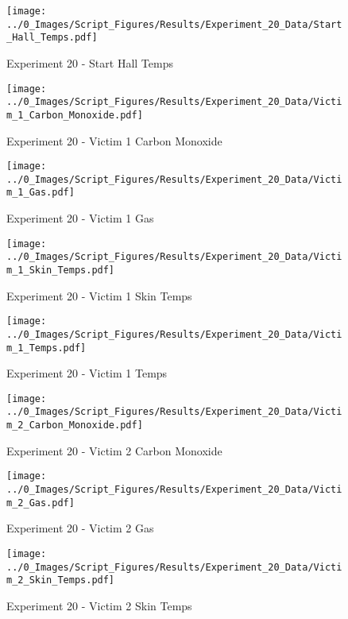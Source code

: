 	\begin{figure}[H]
		\centering
		\texttt{[image: ../0\_Images/Script\_Figures/Results/Experiment\_20\_Data/Start\_Hall\_Temps.pdf]}
		\caption[]{Experiment 20 - Start Hall Temps}
	\end{figure}
 
	\clearpage

	\begin{figure}[H]
		\centering
		\texttt{[image: ../0\_Images/Script\_Figures/Results/Experiment\_20\_Data/Victim\_1\_Carbon\_Monoxide.pdf]}
		\caption[]{Experiment 20 - Victim 1 Carbon Monoxide}
	\end{figure}
 

	\begin{figure}[H]
		\centering
		\texttt{[image: ../0\_Images/Script\_Figures/Results/Experiment\_20\_Data/Victim\_1\_Gas.pdf]}
		\caption[]{Experiment 20 - Victim 1 Gas}
	\end{figure}
 
	\clearpage

	\begin{figure}[H]
		\centering
		\texttt{[image: ../0\_Images/Script\_Figures/Results/Experiment\_20\_Data/Victim\_1\_Skin\_Temps.pdf]}
		\caption[]{Experiment 20 - Victim 1 Skin Temps}
	\end{figure}
 

	\begin{figure}[H]
		\centering
		\texttt{[image: ../0\_Images/Script\_Figures/Results/Experiment\_20\_Data/Victim\_1\_Temps.pdf]}
		\caption[]{Experiment 20 - Victim 1 Temps}
	\end{figure}
 
	\clearpage

	\begin{figure}[H]
		\centering
		\texttt{[image: ../0\_Images/Script\_Figures/Results/Experiment\_20\_Data/Victim\_2\_Carbon\_Monoxide.pdf]}
		\caption[]{Experiment 20 - Victim 2 Carbon Monoxide}
	\end{figure}
 

	\begin{figure}[H]
		\centering
		\texttt{[image: ../0\_Images/Script\_Figures/Results/Experiment\_20\_Data/Victim\_2\_Gas.pdf]}
		\caption[]{Experiment 20 - Victim 2 Gas}
	\end{figure}
 
	\clearpage

	\begin{figure}[H]
		\centering
		\texttt{[image: ../0\_Images/Script\_Figures/Results/Experiment\_20\_Data/Victim\_2\_Skin\_Temps.pdf]}
		\caption[]{Experiment 20 - Victim 2 Skin Temps}
	\end{figure}
 

